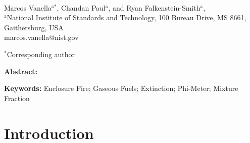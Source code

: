 \documentclass[12pt,letterpaper]{article}
\begin{document}
\begin{flushleft} %

\textbf{}
\vspace{3mm}\\
%
Marcos Vanella$^\text{a*}$, Chandan Paul$^\text{a}$, and Ryan Falkenstein-Smith$^\text{a}$,
\vspace{3mm}\\	

$^\text{a}$National Institute of Standards and Technology, 100 Bureau Drive, MS 8661, Gaithersburg, USA  \\
marcos.vanella@nist.gov
\vspace{3mm}

$^*$Corresponding author


\textbf{Abstract:}

\vspace{3mm}


\textbf{Keywords:}
Enclosure Fire; Gaseous Fuels; Extinction; Phi-Meter; Mixture Fraction

\section{Introduction} \addvspace{10pt}
\label{sec:introduction}


\end{flushleft}
\end{document}
